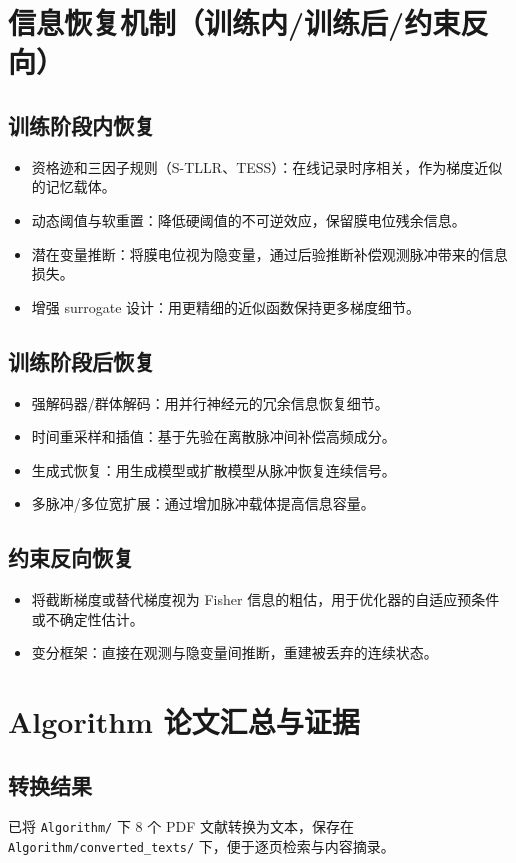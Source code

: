 \documentclass[journal,12pt,onecolumn]{IEEEtran}
\begin{document}
\section{信息恢复机制（训练内/训练后/约束反向）}
\subsection{训练阶段内恢复}
\begin{itemize}
  \item 资格迹和三因子规则（S-TLLR、TESS）：在线记录时序相关，作为梯度近似的记忆载体。\
  \item 动态阈值与软重置：降低硬阈值的不可逆效应，保留膜电位残余信息。\
  \item 潜在变量推断：将膜电位视为隐变量，通过后验推断补偿观测脉冲带来的信息损失。\
  \item 增强 surrogate 设计：用更精细的近似函数保持更多梯度细节。\
\end{itemize}

\subsection{训练阶段后恢复}
\begin{itemize}
  \item 强解码器/群体解码：用并行神经元的冗余信息恢复细节。\
  \item 时间重采样和插值：基于先验在离散脉冲间补偿高频成分。\
  \item 生成式恢复：用生成模型或扩散模型从脉冲恢复连续信号。\
  \item 多脉冲/多位宽扩展：通过增加脉冲载体提高信息容量。\
\end{itemize}

\subsection{约束反向恢复}
\begin{itemize}
  \item 将截断梯度或替代梯度视为 Fisher 信息的粗估，用于优化器的自适应预条件或不确定性估计。\
  \item 变分框架：直接在观测与隐变量间推断，重建被丢弃的连续状态。\
\end{itemize}

\section{Algorithm 论文汇总与证据}
\subsection{转换结果}
已将 \texttt{Algorithm/} 下 8 个 PDF 文献转换为文本，保存在 \texttt{Algorithm/converted\_texts/} 下，便于逐页检索与内容摘录。\\
\end{document}
